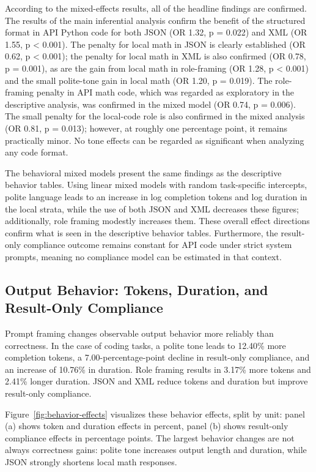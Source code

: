 \documentclass{llncs}
\begin{document}
According to the mixed-effects results, all of the headline findings are confirmed. The results of the main inferential analysis confirm the benefit of the structured format in API Python code for both JSON (OR 1.32, p = 0.022) and XML (OR 1.55, p \textless{} 0.001). The penalty for local math in JSON is clearly established (OR 0.62, p \textless{} 0.001); the penalty for local math in XML is also confirmed (OR 0.78, p = 0.001), as are the gain from local math in role-framing (OR 1.28, p \textless{} 0.001) and the small polite-tone gain in local math (OR 1.20, p = 0.019). The role-framing penalty in API math code, which was regarded as exploratory in the descriptive analysis, was confirmed in the mixed model (OR 0.74, p = 0.006). The small penalty for the local-code role is also confirmed in the mixed analysis (OR 0.81, p = 0.013); however, at roughly one percentage point, it remains practically minor. No tone effects can be regarded as significant when analyzing any code format.

The behavioral mixed models present the same findings as the descriptive behavior tables. Using linear mixed models with random task-specific intercepts, polite language leads to an increase in log completion tokens and log duration in the local strata, while the use of both JSON and XML decreases these figures; additionally, role framing modestly increases them. These overall effect directions confirm what is seen in the descriptive behavior tables. Furthermore, the result-only compliance outcome remains constant for API code under strict system prompts, meaning no compliance model can be estimated in that context.

\subsection{Output Behavior: Tokens, Duration, and Result-Only Compliance}\label{output-behavior-tokens-duration-and-result-only-compliance}

Prompt framing changes observable output behavior more reliably than
correctness. In the case of coding tasks, a polite tone leads to 12.40\% more completion tokens, a 7.00-percentage-point decline in result-only compliance, and an increase of 10.76\% in duration. Role framing results in 3.17\% more tokens and 2.41\% longer duration. JSON and XML reduce tokens and duration but improve result-only compliance.

Figure~\ref{fig:behavior-effects} visualizes these behavior effects, split by unit: panel (a) shows token and duration effects in percent, panel (b) shows result-only compliance effects in percentage points. The largest behavior changes
are not always correctness gains: polite tone increases output length
and duration, while JSON strongly shortens local math responses.
\end{document}
